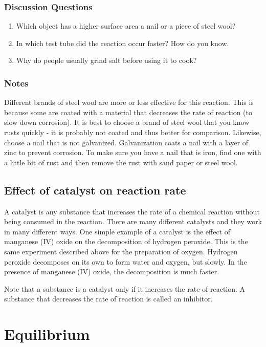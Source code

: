 \subsubsection*{Discussion Questions}
\begin{enumerate}
\item{Which object has a higher surface area a nail or a piece of steel wool?}
\item{In which test tube did the reaction occur faster? How do you know.}
\item{Why do people usually grind salt before using it to cook?}
\end{enumerate}

\subsubsection*{Notes}
Different brands of steel wool are more or less effective for this reaction. This is because some are coated with a material that decreases the rate of reaction (to slow down corrosion). It is best to choose a brand of steel wool that you know rusts quickly - it is probably not coated and thus better for comparison. Likewise, choose a nail that is not galvanized. Galvanization coats a nail with a layer of zinc to prevent corrosion. To make sure you have a nail that is iron, find one with a little bit of rust and then remove the rust with sand paper or steel wool.

\subsection{Effect of catalyst on reaction rate}

A catalyst is any substance that increases the rate of a chemical reaction without being consumed in the reaction. There are many different catalysts and they work in many different ways. One simple example of a catalyst is the effect of manganese (IV) oxide on the decomposition of hydrogen peroxide. This is the same experiment described above for the preparation of oxygen. Hydrogen peroxide decomposes on its own to form water and oxygen, but slowly. In the presence of manganese (IV) oxide, the decomposition is much faster.

Note that a substance is a catalyst only if it increases the rate of reaction. A substance that decreases the rate of reaction is called an inhibitor.

\section{Equilibrium}

